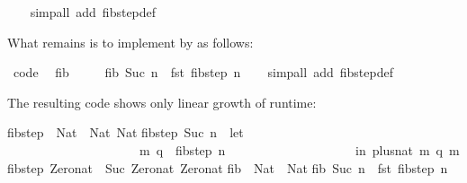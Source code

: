 \begin{isabellebody}
\ \ \isamarkupfalse%
\ {\isacharparenleft}simp{\isacharunderscore}all\ add{\isacharcolon}\ fib{\isacharunderscore}step{\isacharunderscore}def{\isacharparenright}%
\endisatagquote
{\isafoldquote}%
%
\isadelimquote
%
\endisadelimquote
%
\begin{isamarkuptext}%
\noindent What remains is to implement  by  as follows:%
\end{isamarkuptext}%
\isamarkuptrue%
%
\isadelimquote
%
\endisadelimquote
%
\isatagquote
{}\isamarkupfalse%
\ {\isacharbrackleft}code{\isacharbrackright}{\isacharcolon}\isanewline
\ \ {\isachardoublequoteopen}fib\ {}\ {\isacharequal}\ {}{\isachardoublequoteclose}\isanewline
\ \ {\isachardoublequoteopen}fib\ {\isacharparenleft}Suc\ n{\isacharparenright}\ {\isacharequal}\ fst\ {\isacharparenleft}fib{\isacharunderscore}step\ n{\isacharparenright}{\isachardoublequoteclose}\isanewline
\ \ \isamarkupfalse%
\ {\isacharparenleft}simp{\isacharunderscore}all\ add{\isacharcolon}\ fib{\isacharunderscore}step{\isacharunderscore}def{\isacharparenright}%
\endisatagquote
{\isafoldquote}%
%
\isadelimquote
%
\endisadelimquote
%
\begin{isamarkuptext}%
\noindent The resulting code shows only linear growth of runtime:%
\end{isamarkuptext}%
\isamarkuptrue%
%
\isadelimtypewriter
%
\endisadelimtypewriter
%
\isatagtypewriter
%
\begin{isamarkuptext}%
fib{\isacharunderscore}step\ {\isacharcolon}{\isacharcolon}\ Nat\ {\isacharminus}{\isachargreater}\ {\isacharparenleft}Nat{\isacharcomma}\ Nat{\isacharparenright}{\isacharsemicolon}\isanewline
fib{\isacharunderscore}step\ {\isacharparenleft}Suc\ n{\isacharparenright}\ {\isacharequal}\ let\ {\isacharbraceleft}\isanewline
\ \ \ \ \ \ \ \ \ \ \ \ \ \ \ \ \ \ \ \ \ {\isacharparenleft}m{\isacharcomma}\ q{\isacharparenright}\ {\isacharequal}\ fib{\isacharunderscore}step\ n{\isacharsemicolon}\isanewline
\ \ \ \ \ \ \ \ \ \ \ \ \ \ \ \ \ \ \ {\isacharbraceright}\ in\ {\isacharparenleft}plus{\isacharunderscore}nat\ m\ q{\isacharcomma}\ m{\isacharparenright}{\isacharsemicolon}\isanewline
fib{\isacharunderscore}step\ Zero{\isacharunderscore}nat\ {\isacharequal}\ {\isacharparenleft}Suc\ Zero{\isacharunderscore}nat{\isacharcomma}\ Zero{\isacharunderscore}nat{\isacharparenright}{\isacharsemicolon}\isanewline
\isanewline
fib\ {\isacharcolon}{\isacharcolon}\ Nat\ {\isacharminus}{\isachargreater}\ Nat{\isacharsemicolon}\isanewline
fib\ {\isacharparenleft}Suc\ n{\isacharparenright}\ {\isacharequal}\ fst\ {\isacharparenleft}fib{\isacharunderscore}step\ n{\isacharparenright}{\isacharsemicolon}\isanewline

\end{isamarkuptext}
\end{isabellebody}
